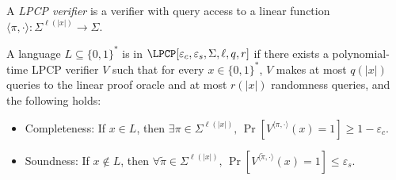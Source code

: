\begin{definition}
\label{LPCPVerifier}
\leanok
A \emph{LPCP verifier} is a verifier with query access to a linear function
$\langle \pi,\cdot \rangle : \Sigma^{\ell(|x|)} \to \Sigma$.
\end{definition}

\begin{definition}
\label{LPCP}
\leanok
A language $L \subseteq \{0,1\}^*$ is in
$\LPCP[\varepsilon_c, \varepsilon_s, \Sigma, \ell, q, r]$
if there exists a polynomial-time LPCP verifier $V$
such that for every $x \in \{0,1\}^*$,
$V$ makes at most $q(|x|)$ queries to the linear proof oracle and
at most $r(|x|)$ randomness queries, and the following holds:
\begin{itemize}
  \item Completeness: If $x \in L$, then
  $\exists \pi \in \Sigma^{\ell(|x|)}, \,
  \Pr\left[V^{\langle \pi, \cdot \rangle}(x)=1 \right]
  \geq 1 - \varepsilon_c$.
  \item Soundness: If $x \notin L$, then
  $\forall \widetilde{\pi} \in \Sigma^{\ell(|x|)},\,
  \Pr\left[V^{\langle \widetilde{\pi}, \cdot \rangle}(x)=1 \right]
  \leq \varepsilon_s$.
\end{itemize}
\end{definition}




